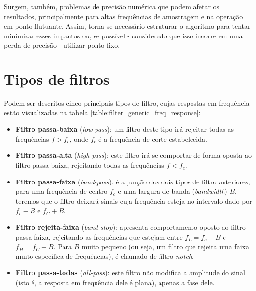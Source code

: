 \begin{itemize}
Surgem, também, problemas de precisão numérica que podem afetar os resultados, principalmente para altas frequências de amostragem e na operação em ponto flutuante. Assim, torna-se necessário estruturar o algoritmo para tentar minimizar esses impactos ou, se possível - considerado que isso incorre em uma perda de precisão - utilizar ponto fixo. \cite{smith_dsp}

\end{itemize}

\section{Tipos de filtros}

Podem ser descritos cinco principais tipos de filtro, cujas respostas em frequência estão visualizadas na tabela \ref{table:filter_generic_freq_response}:

\begin{itemize}
\item{\textbf{Filtro passa-baixa} (\textit{low-pass}):} um filtro deste tipo irá rejeitar todas as frequências $f > f_c$, onde $f_c$ é a frequência de corte estabelecida.
\item{\textbf{Filtro passa-alta} (\textit{high-pass}):} este filtro irá se comportar de forma oposta ao filtro passa-baixa, rejeitando todas as frequências $f < f_c$.
\item{\textbf{Filtro passa-faixa} (\textit{band-pass}):} é a junção dos dois tipos de filtro anteriores; para uma frequência de centro $f_c$ e uma largura de banda (\textit{bandwidth}) $B$, teremos que o filtro deixará sinais cuja frequência esteja no intervalo dado por $f_c - B$ e $f_C + B$.
\item{\textbf{Filtro rejeita-faixa} (\textit{band-stop}):} apresenta comportamento oposto ao filtro passa-faixa, rejeitando as frequências que estejam entre $f_L = f_c - B$ e $f_H = f_C + B$. Para $B$ muito pequeno (ou seja, um filtro que rejeita uma faixa muito específica de frequências), é chamado de filtro \textit{notch}.
\item{\textbf{Filtro passa-todas} (\textit{all-pass}):} este filtro não modifica a amplitude do sinal (isto é, a resposta em frequência dele é plana), apenas a fase dele.
\end{itemize}


